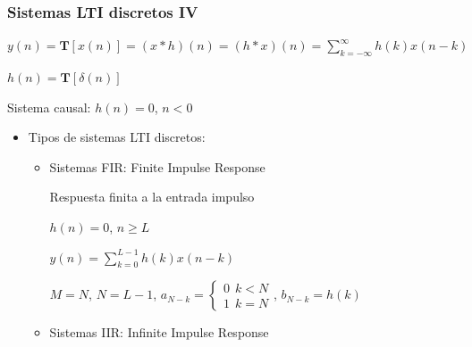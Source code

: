 \begin{frame}
\frametitle{Sistemas LTI discretos IV}

\vspace{-0,0cm}

\hspace{1.3cm} {\footnotesize $y(n)=\bm{T}[x(n)]=(x*h)(n)=(h*x)(n)=\sum_{k=-\infty}^\infty h(k)x(n-k)$

\vspace{0,2cm}

\hspace{1.3cm}  $h(n)=\bm{T}[\delta(n)]$}

\vspace{0,2cm}

\hspace{1.25cm} {\small Sistema causal:} {\footnotesize $h(n)=0$, $n<0$}


\begin{itemize}

\item \small {Tipos de sistemas LTI discretos}:



\begin{itemize}

\item \alert{Sistemas FIR}: Finite Impulse Response

 \vspace{0.1cm}

\hspace{2.2cm} Respuesta finita a la entrada impulso  

 \vspace{0.1cm}

\footnotesize{
\hspace{2.2cm} \alert{$h(n)=0$,  $n \ge L$}

 \vspace{0.2cm}

\hspace{2.2cm}   $y(n)=\sum_{k=0}^{L-1} h(k)x(n-k)$


\hspace{2.2cm}   \color{gray} $M=N$, $N=L-1$, $a_{N-k}\!=\!\left\{\begin{array}{l}  0 \: \: k<N \\ 1 \:\: k=N \end{array}\right.$, $b_{N-k}=h(k)$ \color{black}
}
					

\item  \alert{Sistemas IIR}: Infinite Impulse Response

 \vspace{0.1cm}


\end{itemize}
\end{itemize}
\end{frame}
